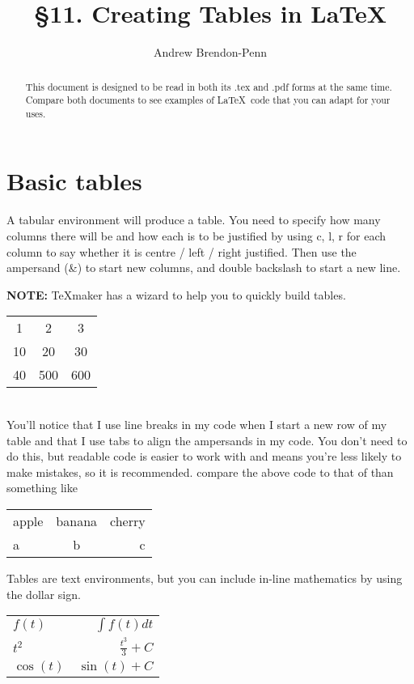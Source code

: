 \documentclass[a4paper,11pt]{article}
\title{\S 11. Creating Tables in \LaTeX }
\author{Andrew Brendon-Penn}
\begin{document}
\maketitle

\begin{abstract}
This document is designed to be read in both its .tex and .pdf forms at the same time. Compare both documents to see examples of \LaTeX \, code that you can adapt for your uses.
\end{abstract}

\tableofcontents

\pagebreak

\section{Basic tables}

A tabular environment will produce a table. You need to specify how many columns there will be and how each is to be justified by using c, l, r for each column to say whether it is centre / left /  right justified. Then use the ampersand (\&) to start new columns, and double backslash to start a new line.

\textbf{NOTE:} TeXmaker has a wizard to help you to quickly build tables.
%
\begin{tabular}{c c c}	%
	1	& 2		& 3  \\	%
	10	& 20 	& 30 \\	%
	40 	& 500 	& 600
\end{tabular}\\

You'll notice that I use line breaks in my code when I start a new row of my table and that I use tabs to align the ampersands in my code. You don't need to do this, but readable code is easier to work with and means you're less likely to make mistakes, so it is recommended. compare the above code to that of than something like
%
\begin{tabular}{l c r} apple & banana & cherry \\a & b & c \end{tabular}

Tables are text environments, but you can include in-line mathematics by using the dollar sign.
%
\begin{tabular}{lr} %
	$f(t)$    & $\int f(t)dt$ \\
	$t^2$     & $\frac{t^3}{3}+C$ \\
	$\cos(t)$ & $\sin(t)+C$ \\
\end{tabular}
\end{document}
